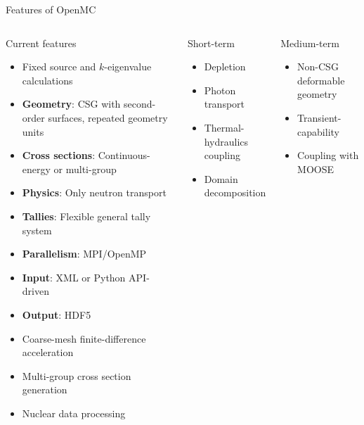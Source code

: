 \documentclass[noamssymb,svgnames]{beamer}
\begin{document}
\begin{frame}{Features of OpenMC}
  \begin{columns}[T]
    \begin{block}{Current features}
      \begin{itemize}
      \item Fixed source and $k$-eigenvalue calculations
      \item \textbf{Geometry}: CSG with second-order surfaces, repeated geometry units
      \item \textbf{Cross sections}: Continuous-energy or multi-group
      \item \textbf{Physics}: Only neutron transport
      \item \textbf{Tallies}: Flexible general tally system
      \item \textbf{Parallelism}: MPI/OpenMP
      \item \textbf{Input}: XML or Python API-driven
      \item \textbf{Output}: HDF5
      \item Coarse-mesh finite-difference acceleration
      \item Multi-group cross section generation
      \item Nuclear data processing
      \end{itemize}
    \end{block}
    \begin{block}{Short-term}
      \begin{itemize}
      \item Depletion
      \item Photon transport
      \item Thermal-hydraulics coupling
      \item Domain decomposition
      \end{itemize}
    \end{block}
    \begin{block}{Medium-term}
      \begin{itemize}
      \item Non-CSG deformable geometry
      \item Transient-capability
      \item Coupling with MOOSE
      \end{itemize}
    \end{block}
  \end{columns}
\end{frame}
\end{document}
